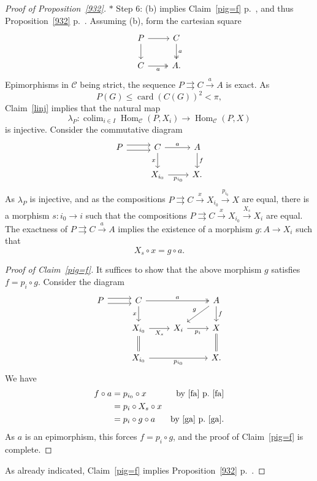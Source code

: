 \documentclass[12pt]{article}
\theoremstyle{remark}
\theoremstyle{definition}
\newcommand{\nn}{\noindent}
\newcommand{\C}{\mathcal C}
\newcommand{\parar}{\rightrightarrows}
\newcommand{\xr}{\xrightarrow}
\DeclareMathOperator*{\colim}{colim}
\DeclareMathOperator{\card}{card}
\DeclareMathOperator{\Hom}{Hom}
\begin{document}
\begin{proof}[Proof of Proposition~\ref{932}]
\nn$*$ Step 6: (b) implies Claim~\ref{pig=f} p.~\pageref{pig=f}, and thus Proposition~\ref{932} p.~\pageref{932}. Assuming (b), form the cartesian square 
$$
\begin{tikzcd}
P\ar{r}\ar{d}&C\ar[two heads]{d}{a}\\ 
C\ar[two heads]{r}[swap]{a}&A.
\end{tikzcd}
$$
Epimorphisms in $\C$ being strict, the sequence $P\parar C\xr aA$ is exact. As 
$$
P(G)\le\card(C(G))^2<\pi,
$$ 
Claim~\ref{linj} implies that the natural map 
$$
\lambda_P:\colim_{i\in I}\Hom_\C(P,X_i)\to\Hom_\C(P,X)
$$ 
is injective. Consider the commutative diagram 
$$
\begin{tikzcd}
P\ar[yshift=0.7ex]{r}\ar[yshift=-0.7ex]{r}&C\ar{r}{a}\ar{d}[swap]{x}&A\ar{d}{f}\\ 
{}&X_{i_0}\ar{r}[swap]{p_{i_0}}&X.
\end{tikzcd}
$$ 
As $\lambda_P$ is injective, and as the compositions $P\parar C\xr xX_{i_0}\xr{p_{i_0}}X$ are equal, there is a morphism $s:i_0\to i$ such that the compositions $P\parar C\xr xX_{i_0}\xr{X_s} X_i$ are equal. The exactness of $P\parar C\xr aA$ implies the existence of a morphism $g:A\to X_i$ such that 
%
\begin{equation}\label{ga}
X_s\circ x=g\circ a.
\end{equation} 
% 

\begin{proof}[Proof of Claim~\ref{pig=f}]
It suffices to show that the above morphism $g$ satisfies $f=p_i\circ g$. Consider the diagram 
$$
\begin{tikzcd}
P\ar[yshift=0.7ex]{r}\ar[yshift=-0.7ex]{r}&C\ar{d}[swap]{x}\ar[two heads]{rr}{a}&&A\ar{dl}[swap]{g}\ar{d}{f}\\ 
{}&X_{i_0}\ar{r}[swap]{X_s}\ar[equal]{d}&X_i\ar{r}[swap]{p_i}&X\ar[equal]{d}\\ 
{}&X_{i_0}\ar{rr}[swap]{p_{i_0}}&&X.
\end{tikzcd}
$$ 
We have 
%
\begin{align*}
f\circ a&=p_{i_0}\circ x&\text{by \eqref{fa} p.~\pageref{fa}}\\ 
&=p_i\circ X_s\circ x\\ 
&=p_i\circ g\circ a&\text{by \eqref{ga} p.~\pageref{ga}}.
\end{align*}
%
As $a$ is an epimorphism, this forces $f=p_i\circ g$, and the proof of Claim~\ref{pig=f} is complete. 
\end{proof} 

As already indicated, Claim~\ref{pig=f} implies Proposition~\ref{932} p.~\pageref{932}. 
\end{proof}  
\end{document}
